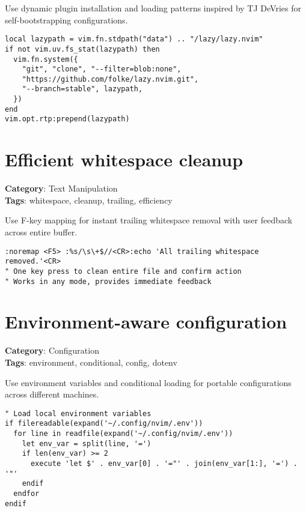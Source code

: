 {{{Use dynamic plugin installation and loading patterns inspired by TJ DeVries for self-bootstrapping configurations.

\begin{Exa*}{}
\begin{Verbatim}[fontsize=\footnotesize, breaklines, breakanywhere]
local lazypath = vim.fn.stdpath("data") .. "/lazy/lazy.nvim"
if not vim.uv.fs_stat(lazypath) then
  vim.fn.system({
    "git", "clone", "--filter=blob:none",
    "https://github.com/folke/lazy.nvim.git",
    "--branch=stable", lazypath,
  })
end
vim.opt.rtp:prepend(lazypath)
\end{Verbatim}
\end{Exa*}

\section{Efficient whitespace cleanup}

\textbf{Category}: Text Manipulation\\ \textbf{Tags}: whitespace, cleanup, trailing, efficiency
\vspace{0.5cm}

Use F-key mapping for instant trailing whitespace removal with user feedback across entire buffer.

\begin{Exa*}{}
\begin{Verbatim}[fontsize=\footnotesize, breaklines, breakanywhere]
:noremap <F5> :%s/\s\+$//<CR>:echo 'All trailing whitespace removed.'<CR>
" One key press to clean entire file and confirm action
" Works in any mode, provides immediate feedback
\end{Verbatim}
\end{Exa*}

\section{Environment-aware configuration}

\textbf{Category}: Configuration\\ \textbf{Tags}: environment, conditional, config, dotenv
\vspace{0.5cm}

Use environment variables and conditional loading for portable configurations across different machines.

\begin{Exa*}{}
\begin{Verbatim}[fontsize=\footnotesize, breaklines, breakanywhere]
" Load local environment variables
if filereadable(expand('~/.config/nvim/.env'))
  for line in readfile(expand('~/.config/nvim/.env'))
    let env_var = split(line, '=')
    if len(env_var) >= 2
      execute 'let $' . env_var[0] . '="' . join(env_var[1:], '=') . '"'
    endif
  endfor
endif
\end{Verbatim}
\end{Exa*}

}}}

